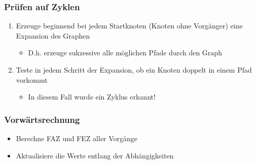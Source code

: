 \documentclass[ngerman, t]{beamer}
\begin{document}
\begin{frame}
  \frametitle{Pr\"ufen auf Zyklen}
  \begin{enumerate}
    \item Erzeuge beginnend bei jedem Startknoten (Knoten ohne
      Vorg\"anger) eine Expansion des Graphen
      \begin{itemize}
        \item D.h. erzeuge sukzessive alle m\"oglichen Pfade durch den Graph
      \end{itemize}
    \item Teste in jedem Schritt der Expansion, ob ein Knoten doppelt
      in einem Pfad vorkommt
      \begin{itemize}
        \item In diesem Fall wurde ein Zyklus erkannt!
      \end{itemize}
  \end{enumerate}
\end{frame}

\begin{frame}
  \frametitle{Vorw\"artsrechnung}
  \begin{itemize}
    \item Berechne FAZ und FEZ aller Vorg\"ange
    \item Aktualisiere die Werte entlang der Abh\"angigkeiten
  \end{itemize}
  \begin{figure}
    \resizebox{\textwidth}{!}{}
  \end{figure}
\end{frame}
\end{document}
